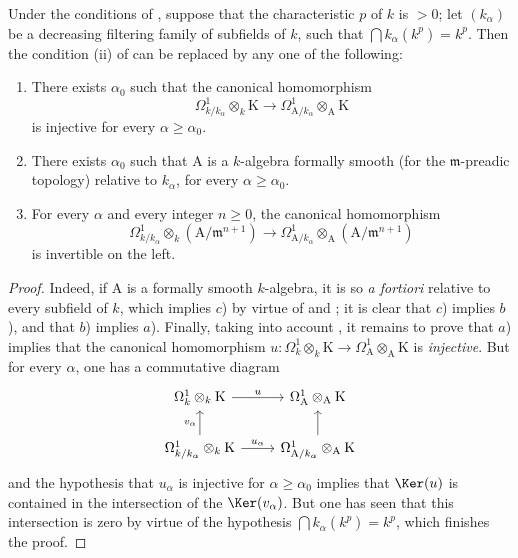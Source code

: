 \begin{proposition}[22.2.8]
\label{0.22.2.8}
Under the conditions of , suppose that the characteristic $p$ of $k$ is $>0$; let $(k_\alpha)$ be a decreasing filtering family of subfields of $k$, such that $\bigcap k_\alpha(k^p)=k^p$.
Then the condition (ii) of  can be replaced by any one of the following:
\begin{enumerate}
  \item[a)] There exists $\alpha_0$ such that the canonical homomorphism
  \[
    \Omega^1_{k/k_\alpha}\otimes_k\mathrm{K}\to\Omega^1_{\mathrm{A}/k_\alpha}\otimes_\mathrm{A}\mathrm{K}
  \]
  is injective for every $\alpha\geq\alpha_0$.
  \item[b)] There exists $\alpha_0$ such that $\mathrm{A}$ is a $k$-algebra formally smooth (for the $\mathfrak{m}$-preadic topology) relative to $k_\alpha$, for every $\alpha\geq\alpha_0$.
  \item[c)] For every $\alpha$ and every integer $n\geq 0$, the canonical homomorphism
  \[
    \Omega^1_{k/k_\alpha}\otimes_k(\mathrm{A}/\mathfrak{m}^{n+1})\to\Omega^1_{\mathrm{A}/k_\alpha}\otimes_\mathrm{A}(\mathrm{A}/\mathfrak{m}^{n+1})
  \]
  is invertible on the left.
\end{enumerate}
\end{proposition}

\begin{proof}
Indeed, if $\mathrm{A}$ is a formally smooth $k$-algebra, it is so \emph{a fortiori} relative to every subfield of $k$, which implies $c$) by virtue of  and ; it is clear that $c$) implies $b$), and that $b$) implies $a$).
Finally, taking into account , it remains to prove that $a$) implies that the canonical homomorphism $u:\Omega^1_k\otimes_k\mathrm{K}\to\Omega^1_\mathrm{A}\otimes_\mathrm{A}\mathrm{K}$ is \emph{injective}.
But for every $\alpha$, one has a commutative diagram
\[
  \begin{tikzcd}
    \Omega^1_k\otimes_k\mathrm{K} \ar[r,"u"] & \Omega^1_\mathrm{A}\otimes_\mathrm{A}\mathrm{K}\\
    \Omega^1_{k/k_\alpha}\otimes_k\mathrm{K} \ar[u,"v_\alpha"] \ar[r,"u_\alpha"] & \Omega^1_{\mathrm{A}/k_\alpha}\otimes_\mathrm{A}\mathrm{K} \ar[u]
  \end{tikzcd}
\]
and the hypothesis that $u_\alpha$ is injective for $\alpha\geq\alpha_0$ implies that $\Ker(u)$ is contained in the intersection of the $\Ker(v_\alpha)$.
But one has seen  that this intersection is zero by virtue of the hypothesis $\bigcap k_\alpha(k^p)=k^p$, which finishes the proof.
\end{proof}


